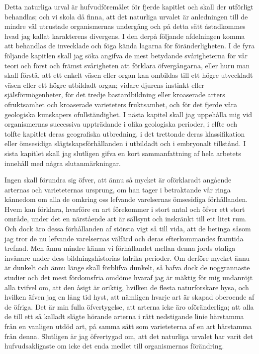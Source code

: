 Detta naturliga urval är hufvudföremålet för fjerde kapitlet och skall der utförligt behandlas; och vi skola då finna, att det naturliga urvalet är anledningen till de mindre väl utrustade organismernas undergång och på detta sätt åstadkommes hvad jag kallat karakterens divergens. I den derpå följande afdelningen komma att behandlas de invecklade och föga kända lagarna för föränderligheten. I de fyra följande kapitlen skall jag söka angifva de mest betydande svårigheterna för vår teori och först och främst svårigheten att förklara öfvergångarna, eller huru man skall förstå, att ett enkelt väsen eller organ kan ombildas till ett högre utveckladt väsen eller ett högre utbildadt organ; vidare djurens instinkt eller själsförmögenheter, för det tredje bastardbildning eller kroaserade arters ofruktsamhet och kroaserade varieteters fruktsamhet, och för det fjerde våra geologiska kunskapers ofullständighet. I nästa kapitel skall jag uppehålla mig vid organismernas successiva uppträdande i olika geologiska perioder, i elfte och tolfte kapitlet deras geografiska utbredning, i det trettonde deras klassifikation eller ömsesidiga slägtskapsförhållanden i utbildadt och i embryonalt tillstånd. I sista kapitlet skall jag slutligen gifva en kort sammanfattning af hela arbetets innehåll med några slutanmärkningar.

Ingen skall förundra sig öfver, att ännu så mycket är oförklaradt angående arternas och varieteternas ursprung, om han tager i betraktande vår ringa kännedom om alla de omkring oss lefvande varelsernas ömsesidiga förhållanden. Hvem kan förklara, hvarföre en art förekommer i stort antal och öfver ett stort område, under det en närstående art är sällsynt och inskränkt till ett litet rum. Och dock äro dessa förhållanden af största vigt så till vida, att de betinga såsom jag tror de nu lefvande varelsernas välfärd och deras efterkommandes framtida trefnad. Men ännu mindre känna vi förhållandet mellan denna jords otaliga invånare under dess bildningshistorias talrika perioder. Om derföre mycket ännu är dunkelt och ännu länge skall förblifva dunkelt, så hafva dock de noggrannaste studier och det mest fördomsfria omdöme hvaraf jag är mäktig för mig undanröjt alla tvifvel om, att den åsigt är oriktig, hvilken de flesta naturforskare hysa, och hvilken äfven jag en lång tid hyst, att nämligen hvarje art är skapad oberoende af de öfriga. Det är min fulla öfvertygelse, att arterna icke äro oföränderliga; att alla de till ett så kalladt slägte hörande arterna i rätt nedstigande linie härstamma från en vanligen utdöd art, på samma sätt som varieteterna af en art härstamma från denna. Slutligen är jag öfvertygad om, att det naturliga urvalet har varit det hufvudsakligaste om icke det enda medlet till organismernas förändring.


